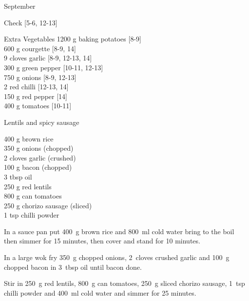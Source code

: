 \begin{menu}{September}
\begin{shoppinglist}{Check}
        {\scriptsize[5-6, 12-13]}\\
      \end{shoppinglist}%
      \begin{shoppinglist}{Extra Vegetables}
      1200 g baking potatoes 
        {\scriptsize[8-9]}\\
      600 g courgette 
        {\scriptsize[8-9, 14]}\\
      9 cloves garlic 
        {\scriptsize[8-9, 12-13, 14]}\\
      300 g green pepper 
        {\scriptsize[10-11, 12-13]}\\
      750 g onions 
        {\scriptsize[8-9, 12-13]}\\
      2  red chilli 
        {\scriptsize[12-13, 14]}\\
      150 g red pepper 
        {\scriptsize[14]}\\
      400 g tomatoes 
        {\scriptsize[10-11]}\\
      \end{shoppinglist}%
      \par\vfil %
    \vfil\clearpage
  
    \begin{recipe}{2}{Lentils and spicy sausage}%
    
		\begin{ingredients}
		400 g brown rice  \\
	350 g onions (chopped) \\
	2 cloves garlic (crushed) \\
	100 g bacon (chopped) \\
	3 tbsp oil  \\
	250 g red lentils  \\
	800 g can tomatoes  \\
	250 g chorizo sausage (sliced) \\
	1 tsp chilli powder  \\
	
		\end{ingredients}
	
    \begin{instructions}
    \item 
      In a
      sauce pan
      put
      400~g  brown rice
      and
      800~ml  cold water
      bring to the boil then simmer for 15 minutes,
      then cover and stand for 10 minutes.
    \item 
        In a large wok fry
        350~g chopped onions,
        2~cloves crushed garlic
        and
        100~g chopped bacon
        in
        3~tbsp  oil
        until bacon done.
      \item 
        Stir in
        250~g  red lentils,
        800~g  can tomatoes,
        250~g sliced chorizo sausage,
        1~tsp  chilli powder
        and
        400~ml  cold water
        and simmer for 25 minutes.
      

\end{instructions}
\end{recipe}
\end{menu}
